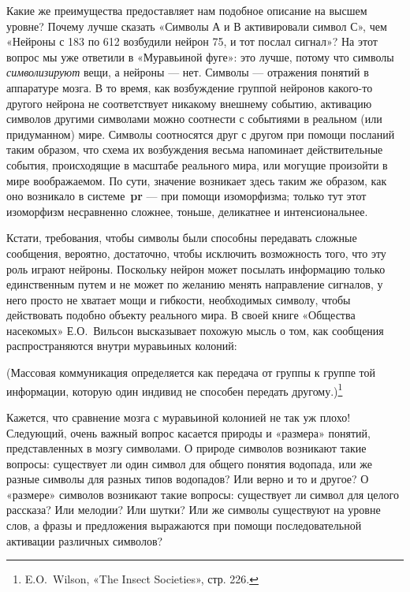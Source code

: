 \documentclass[../main.tex]{subfiles}
\begin{document}
Какие же преимущества предоставляет нам подобное описание на высшем уровне? Почему лучше сказать «Символы А и В активировали символ С», чем «Нейроны с 183 по 612 возбудили нейрон 75, и тот послал сигнал»? На этот вопрос мы уже ответили в «Муравьиной фуге»: это лучше, потому что символы \emph{символизируют} вещи, а нейроны --- нет. Символы --- отражения понятий в аппаратуре мозга. В то время, как возбуждение группой нейронов какого-то другого нейрона не соответствует никакому внешнему событию, активацию символов другими символами можно соотнести с событиями в реальном (или придуманном) мире. Символы соотносятся друг с другом при помощи посланий таким образом, что схема их возбуждения весьма напоминает действительные события, происходящие в масштабе реального мира, или могущие произойти в мире воображаемом. По сути, значение возникает здесь таким же образом, как оно возникало в системе~\textbf{pr} --- при помощи изоморфизма; только тут этот изоморфизм несравненно сложнее, тоньше, деликатнее и интенсиональнее.

Кстати, требования, чтобы символы были способны передавать сложные сообщения, вероятно, достаточно, чтобы исключить возможность того, что эту роль играют нейроны. Поскольку нейрон может посылать информацию только единственным путем и не может по желанию менять направление сигналов, у него просто не хватает мощи и гибкости, необходимых символу, чтобы действовать подобно объекту реального мира. В своей книге «Общества насекомых» Е.О.~Вильсон высказывает похожую мысль о том, как сообщения распространяются внутри муравьиных колоний:

(Массовая коммуникация определяется как передача от группы к группе той информации, которую один индивид не способен передать другому.)\footnote{E.O.~Wilson, «The Insect Societies», стр. 226.}

Кажется, что сравнение мозга с муравьиной колонией не так уж плохо! Следующий, очень важный вопрос касается природы и «размера» понятий, представленных в мозгу символами. О природе символов возникают такие вопросы: существует ли один символ для общего понятия водопада, или же разные символы для разных типов водопадов? Или верно и то и другое? О «размере» символов возникают такие вопросы: существует ли символ для целого рассказа? Или мелодии? Или шутки? Или же символы существуют на уровне слов, а фразы и предложения выражаются при помощи последовательной активации различных символов?
\end{document}
